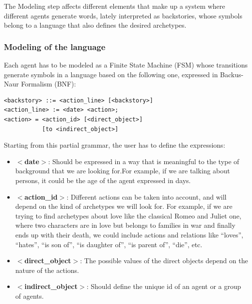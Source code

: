 \documentclass[letterpaper]{article}
\begin{document}
The Modeling step affects different elements that make up a system where different agents generate words, lately interpreted as backstories, whose symbols belong to a language that also defines the desired archetypes.


\subsubsection{Modeling of the language}

Each agent has to be modeled as a Finite State Machine (FSM) \citep{FSM_Booth} whose transitions generate symbols in a language based on the following one, expressed in Backus-Naur Formalism (BNF):

\begin{verbatim}
<backstory> ::= <action_line> [<backstory>]
<action_line> := <date> <action>;
<action> = <action_id> [<direct_object>]
           [to <indirect_object>]
\end{verbatim}

Starting from this partial grammar, the user has to define the expressions:
\begin{itemize}
\item \textbf{$<$date$>$}: Should be expressed in a way that is meaningful to the type of background that we are looking for.For example, if we are talking about persons, it could be the age of the agent expressed in days.

\item \textbf{$<$action\_id$>$}: Different actions can be taken into account, and will depend on the kind of archetypes we will look for. For example, if we are trying to find archetypes about love like the classical Romeo and Juliet one, where two characters are in love but belongs to families in war and finally ends up with their death, we could include actions and relations like ``loves'', ``hates'', ``is son of'', ``is daughter of'', ``is parent of'', ``die'', etc.


\item \textbf{$<$direct\_object$>$}: The possible values of the direct objects depend on the nature of the actions.

\item \textbf{$<$indirect\_object$>$}: Should define the unique id of an agent or a group of agents.

\end{itemize}
\end{document}
